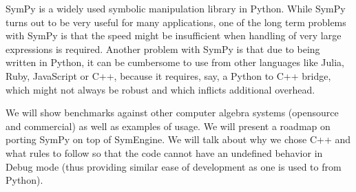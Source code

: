 
SymPy is a widely used symbolic manipulation library in Python. While SymPy turns out to be
very useful for many applications, one of the long term problems with SymPy is that the
speed might be insufficient when handling of very large expressions is required. Another
problem with SymPy is that due to being written in Python, it can be cumbersome to use
from other languages like Julia, Ruby, JavaScript or C++, because it requires, say, a Python
to C++ bridge, which might not always be robust and which inflicts additional overhead.

We will show benchmarks against other computer algebra systems (opensource and commercial)
as well as examples of usage. We will present a roadmap on porting SymPy on top of SymEngine.
We will talk about why we chose C++ and what rules to follow so that the code cannot have an
undefined behavior in Debug mode (thus providing similar ease of development as one is used
to from Python).

